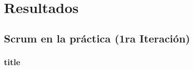 \chapter{Resultados} \label{chapter:III}
\section{Scrum en la pr\'{a}ctica (1ra Iteraci\'{o}n)}
	\subsection{title}
